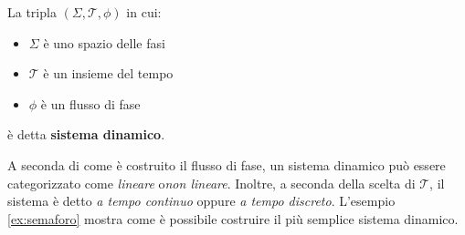 \begin{definition}
    La tripla $(\Sigma, \mathcal T, \phi)$ in cui:
    \begin{itemize}
        \item $\Sigma$ è uno spazio delle fasi%
        \item $\mathcal T$ è un insieme del tempo%
        \item $\phi$ è un flusso di fase%
    \end{itemize}
    è detta \textbf{sistema dinamico}.
\end{definition}

A seconda di come è costruito il flusso di fase, un sistema dinamico
può essere categorizzato come \emph{lineare} o\emph{non lineare}.
Inoltre, a seconda della scelta di $\mathcal T$, il sistema è detto
\emph{a tempo continuo} oppure \emph{a tempo discreto}.
L'esempio \ref{ex:semaforo} mostra come è possibile costruire
il più semplice sistema dinamico.

